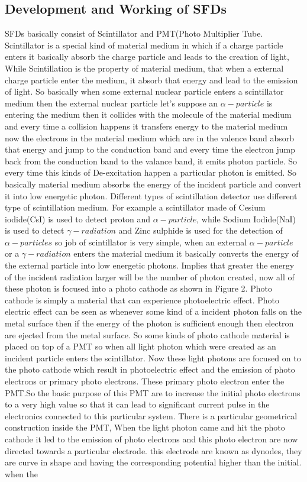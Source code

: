 \documentclass{article}
\begin{document}
\begin{multicols}{2}
\subsection{Development and Working of SFDs}
SFDs basically consist of Scintillator and PMT(Photo Multiplier Tube. Scintillator is a special kind of material medium in which if a charge particle enters it basically absorb the charge particle and leads to the creation of light, While Scintillation is the property of material medium, that when a external charge particle enter the medium, it absorb that energy and lead to the emission of light. So basically when some external nuclear particle enters a scintillator medium then the external nuclear particle let's suppose an $\alpha-particle$ is entering the medium then it collides with the molecule of the material medium and every time a collision happens it transfers energy to the material medium now the electrons in the material medium which are in the valence band absorb that energy and jump to the conduction band and every time the electron jump back from the conduction band to the valance band, it emits photon particle. So every time this kinds of De-excitation happen a particular photon is emitted. So basically material medium  absorbs the energy of the incident particle and convert it into low energetic photon. Different types of scintillation detector use different type of scintillation medium. For example  a scintillator made of Cesium iodide(CsI) is used to detect proton and $\alpha-particle$, while Sodium Iodide(NaI) is used to detect $\gamma-radiation$ and Zinc sulphide is used for the detection of $\alpha-particles$ so job of scintillator is very simple, when an external $\alpha-particle$ or a $\gamma-radiation$ enters the material medium it basically converts the energy of the external particle into low energetic photons. Implies that greater the energy of the incident radiation larger will be the number of photon created, now all of these photon is focused into a photo cathode as shown in Figure 2. Photo cathode is simply a material that can experience photoelectric effect. Photo electric effect can be seen as whenever some kind of a incident photon falls on the metal surface then if the energy of the photon is sufficient enough then electron are ejected from the metal surface. So some kinds of photo cathode material is placed on top of a PMT so when all light photon which were created as an incident particle enters the scintillator. Now these light photons are focused on to the photo cathode which result in photoelectric effect and the emission of photo electrons or primary photo electrons. These primary photo electron enter the PMT.So the basic purpose of this PMT are to increase the initial photo electrons to a very high value so that it can lead to significant current pulse in the electronics connected to this particular system. There is a particular geometrical construction inside the PMT, When the light photon came and hit the photo cathode it led to the emission of photo electrons and this photo electron are now directed towards a particular electrode. this electrode are known as dynodes, they are curve in shape and having the corresponding potential higher than the initial. when the 
\end{multicols}
\end{document}
